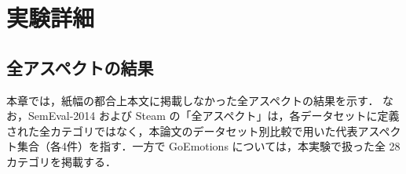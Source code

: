 
\chapter{実験詳細}
\label{chap:appendix}

\section{全アスペクトの結果}
\label{sec:appendix_all_aspects}

本章では，紙幅の都合上本文に掲載しなかった全アスペクトの結果を示す．
なお，SemEval-2014 および Steam の「全アスペクト」は，各データセットに定義された全カテゴリではなく，本論文のデータセット別比較で用いた代表アスペクト集合（各4件）を指す．一方で GoEmotions については，本実験で扱った全 28 カテゴリを掲載する．



